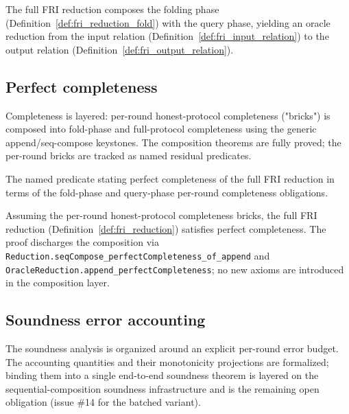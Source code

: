 \begin{definition}\label{def:fri_reduction}
    The full FRI reduction composes the folding phase (Definition~\ref{def:fri_reduction_fold})
    with the query phase, yielding an oracle reduction from the input relation
    (Definition~\ref{def:fri_input_relation}) to the output relation
    (Definition~\ref{def:fri_output_relation}).
\end{definition}

\subsection{Perfect completeness}\label{sec:fri_completeness}

Completeness is layered: per-round honest-protocol completeness ("bricks") is composed into
fold-phase and full-protocol completeness using the generic append/seq-compose keystones. The
composition theorems are fully proved; the per-round bricks are tracked as named residual
predicates.

\begin{definition}\label{def:fri_completeness_residual}
    The named predicate stating perfect completeness of the full FRI reduction in terms of the
    fold-phase and query-phase per-round completeness obligations.
\end{definition}

\begin{theorem}\label{thm:fri_completeness}
    Assuming the per-round honest-protocol completeness bricks, the full FRI reduction
    (Definition~\ref{def:fri_reduction}) satisfies perfect completeness. The proof discharges the
    composition via \texttt{Reduction.seqCompose\_perfectCompleteness\_of\_append} and
    \texttt{OracleReduction.append\_perfectCompleteness}; no new axioms are introduced in the
    composition layer.
\end{theorem}

\subsection{Soundness error accounting}\label{sec:fri_soundness}

The soundness analysis is organized around an explicit per-round error budget. The accounting
quantities and their monotonicity projections are formalized; binding them into a single
end-to-end soundness theorem is layered on the sequential-composition soundness infrastructure
and is the remaining open obligation (issue \#14 for the batched variant).

